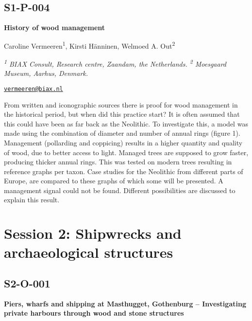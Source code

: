\documentclass[
]{book}
\begin{document}
\hypertarget{s1-p-004}{%
\section*{S1-P-004}\label{s1-p-004}}

\textbf{History of wood management}

Caroline Vermeeren\textsuperscript{1}, Kirsti Hänninen, Welmoed A. Out\textsuperscript{2}

\emph{\textsuperscript{1} BIAX Consult, Research centre, Zaandam, the Netherlands. \textsuperscript{2} Moesgaard Museum, Aarhus, Denmark.}

\href{mailto:vermeeren@biax.nl}{\nolinkurl{vermeeren@biax.nl}}

From written and iconographic sources there is proof for wood management in the historical period, but when did this practice start? It is often assumed that this could have been as far back as the Neolithic. To investigate this, a model was made using the combination of diameter and number of annual rings (figure 1). Management (pollarding and coppicing) results in a higher quantity and quality of wood, due to better access to light. Managed trees are supposed to grow faster, producing thicker annual rings. This was tested on modern trees resulting in reference graphs per taxon. Case studies for the Neolithic from different parts of Europe, are compared to these graphs of which some will be presented. A management signal could not be found. Different possibilities are discussed to explain this result.

\hypertarget{session-2-shipwrecks-and-archaeological-structures}{%
\chapter*{Session 2: Shipwrecks and archaeological structures}\label{session-2-shipwrecks-and-archaeological-structures}}

\hypertarget{s2-o-001}{%
\section*{S2-O-001}\label{s2-o-001}}

\textbf{Piers, wharfs and shipping at Masthugget, Gothenburg -- Investigating private harbours through wood and stone structures}
\end{document}
